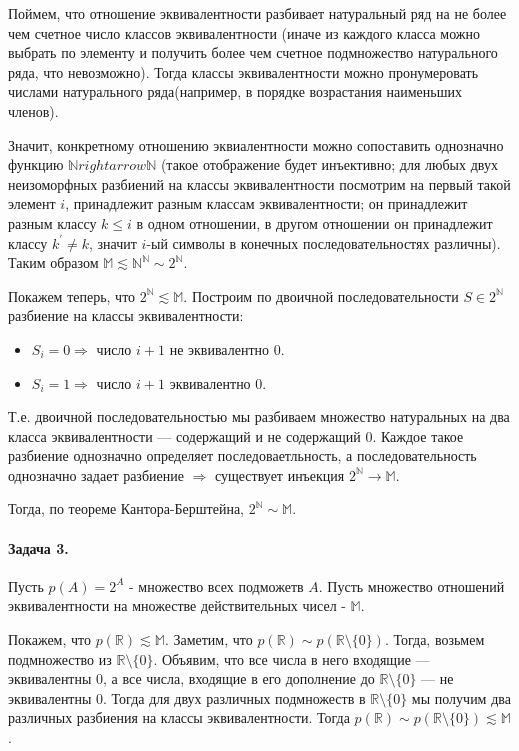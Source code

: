 \documentclass{article}
\newcommand{\pr}{^{\prime}}
\newcommand{\N}{\mathbb{N}}
\newcommand{\R}{\mathbb{R}}
\newcommand{\M}{\mathbb{M}}
\newcommand{\conti}{2^{\N}}
\begin{document}
     Поймем, что отношение эквивалентности разбивает натуральный ряд на не более чем счетное число классов эквивалентности (иначе из каждого класса можно выбрать по элементу и получить более чем счетное подмножество натурального ряда, что невозможно).
     Тогда классы эквивалентности можно пронумеровать числами натурального ряда(например, в порядке возрастания наименьших членов).

     Значит, конкретному отношению эквиалентности можно сопоставить однозначно функцию $\N rightarrow \N$ (такое отображение будет инъективно; для любых двух неизоморфных разбиений на классы эквивалентности посмотрим на первый такой элемент $i$, принадлежит разным классам эквивалентности; он принадлежит разным классу $k \le i$ в одном отношении, в другом отношении он принадлежит классу $k\pr \ne k$, значит $i$-ый символы в конечных последовательностях различны). Таким образом $\M \apprle \N^{\N} \sim \conti$.

     Покажем теперь, что $\conti \apprle \M$. Построим по двоичной последовательности $S \in \conti$ разбиение на классы эквивалентности:

    \begin{itemize}
        \item $S_i = 0 \Rightarrow $ число $i + 1$ не эквивалентно 0.
        \item $S_i = 1 \Rightarrow $ число $i + 1$    эквивалентно 0.    
    \end{itemize}

    Т.е. двоичной последовательностью мы разбиваем множество натуральных на два класса эквивалентности --- содержащий и не содержащий 0. Каждое такое разбиение однозначно определяет последоваетльность, а последовательность однозначно задает разбиение $\Rightarrow$ существует инъекция $\conti \rightarrow \M$.

    Тогда, по теореме Кантора-Берштейна, $\conti \sim \M$.

     \paragraph{Задача 3.}
     Пусть $p(A) = 2^{A}$ - множество всех подможетв $A$.
     Пусть множество отношений эквивалентности на множестве действительных чисел - $\M$.

     Покажем, что $p(\R) \apprle \M$. Заметим, что $p(\R) \sim p(\R \setminus \{0\})$. 
     Тогда, возьмем подмножество из $\R \setminus \{0\}$. Объявим, что все числа в него входящие --- эквивалентны $0$, а все числа, входящие в его дополнение до $\R \setminus \{0\}$ --- не эквивалентны $0$.
     Тогда для двух различных подмножеств в $\R \setminus \{0\}$ мы получим два различных разбиения на классы эквивалентности. Тогда $p(\R) \sim p(\R \setminus \{0\}) \apprle \M$.
\end{document}
